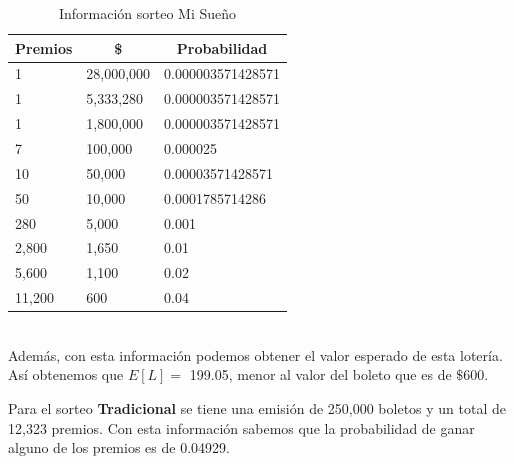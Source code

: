 \begin{table}[H]
\centering
\caption{Información sorteo Mi Sueño}
\label{tab:misuen}
\begin{tabular}{@{}lll@{}}
\toprule
\multicolumn{1}{c}{Premios} & \multicolumn{1}{c}{\$} & \multicolumn{1}{c}{Probabilidad} \\ \midrule
1                           & 28,000,000               & 0.000003571428571        \\
1                           & 5,333,280                & 0.000003571428571        \\
1                           & 1,800,000                & 0.000003571428571        \\
7                           & 100,000                 & 0.000025                 \\
10                          & 50,000                  & 0.00003571428571         \\
50                          & 10,000                  & 0.0001785714286          \\
280                         & 5,000                   & 0.001                    \\
2,800                        & 1,650                   & 0.01                     \\
5,600                        & 1,100                   & 0.02                     \\
11,200                       & 600                    & 0.04                     \\ \bottomrule
\end{tabular}
\end{table} \\

Además, con esta información podemos obtener el valor esperado de esta lotería. Así obtenemos que $E[L] = $ 199.05, menor al valor del boleto que es de $\$ 600$. 

\newpage
Para el sorteo \textbf{Tradicional} se tiene una emisión de 250,000 boletos y un total de 12,323 premios. Con esta información sabemos que la probabilidad de ganar alguno de los premios es de 0.04929.

